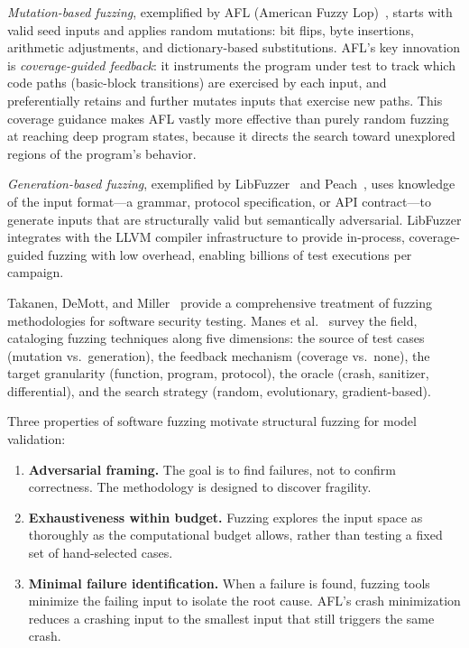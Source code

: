 \documentclass[manuscript,review,anonymous]{acmart}
\begin{document}
\emph{Mutation-based fuzzing}, exemplified by AFL (American Fuzzy Lop)~\cite{zalewski2014}, starts with valid seed inputs and applies random mutations: bit flips, byte insertions, arithmetic adjustments, and dictionary-based substitutions.
AFL's key innovation is \emph{coverage-guided feedback}: it instruments the program under test to track which code paths (basic-block transitions) are exercised by each input, and preferentially retains and further mutates inputs that exercise new paths.
This coverage guidance makes AFL vastly more effective than purely random fuzzing at reaching deep program states, because it directs the search toward unexplored regions of the program's behavior.

\emph{Generation-based fuzzing}, exemplified by LibFuzzer~\cite{serebryany2016} and Peach~\cite{eddington2009}, uses knowledge of the input format---a grammar, protocol specification, or API contract---to generate inputs that are structurally valid but semantically adversarial.
LibFuzzer integrates with the LLVM compiler infrastructure to provide in-process, coverage-guided fuzzing with low overhead, enabling billions of test executions per campaign.

Takanen, DeMott, and Miller~\cite{takanen2008} provide a comprehensive treatment of fuzzing methodologies for software security testing.
Manes et al.~\cite{manes2021} survey the field, cataloging fuzzing techniques along five dimensions: the source of test cases (mutation vs.\ generation), the feedback mechanism (coverage vs.\ none), the target granularity (function, program, protocol), the oracle (crash, sanitizer, differential), and the search strategy (random, evolutionary, gradient-based).

Three properties of software fuzzing motivate structural fuzzing for model validation:

\begin{enumerate}
    \item \textbf{Adversarial framing.} The goal is to find failures, not to confirm correctness. The methodology is designed to discover fragility.
    \item \textbf{Exhaustiveness within budget.} Fuzzing explores the input space as thoroughly as the computational budget allows, rather than testing a fixed set of hand-selected cases.
    \item \textbf{Minimal failure identification.} When a failure is found, fuzzing tools minimize the failing input to isolate the root cause. AFL's crash minimization reduces a crashing input to the smallest input that still triggers the same crash.
\end{enumerate}
\end{document}
